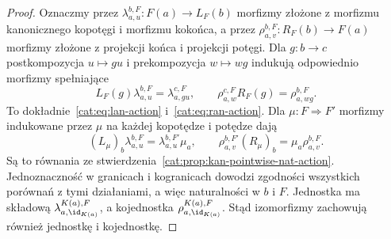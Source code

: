 \begin{proof}
Oznaczmy przez $\lambda^{b,F}_{a,u}:F(a)\to L_F(b)$ morfizmy złożone z morfizmu kanonicznego kopotęgi i morfizmu kokońca, a przez $\rho^{b,F}_{a,v}:R_F(b)\to F(a)$ morfizmy złożone z projekcji końca i projekcji potęgi. Dla $g:b\to c$ postkompozycja $u\mapsto gu$ i prekompozycja $w\mapsto wg$ indukują odpowiednio morfizmy spełniające
\[
 L_F(g)\lambda^{b,F}_{a,u}=\lambda^{c,F}_{a,gu},
 \qquad
 \rho^{c,F}_{a,w}R_F(g)=\rho^{b,F}_{a,wg}.
\]
To dokładnie~\eqref{cat:eq:lan-action} i~\eqref{cat:eq:ran-action}. Dla $\mu:F\Rightarrow F'$ morfizmy indukowane przez $\mu$ na każdej kopotędze i potędze dają
\[
 (L_\mu)_b\lambda^{b,F}_{a,u}=\lambda^{b,F'}_{a,u}\mu_a,
 \qquad
 \rho^{b,F'}_{a,v}(R_\mu)_b=\mu_a\rho^{b,F}_{a,v}.
\]
Są to równania ze stwierdzenia~\ref{cat:prop:kan-pointwise-nat-action}. Jednoznaczność w granicach i kogranicach dowodzi zgodności wszystkich porównań z tymi działaniami, a więc naturalności w $b$ i $F$. Jednostka ma składową $\lambda^{K(a),F}_{a,\id_{K(a)}}$, a kojednostka $\rho^{K(a),F}_{a,\id_{K(a)}}$. Stąd izomorfizmy zachowują również jednostkę i kojednostkę.
\end{proof}

